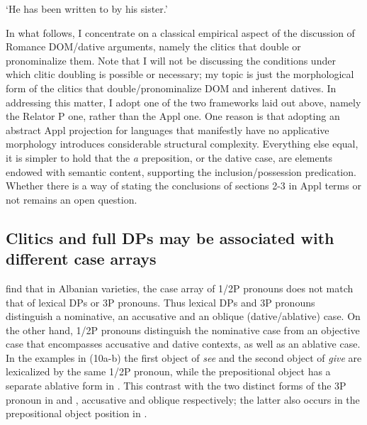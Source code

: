 \documentclass[output=paper]{langscibook}
\begin{document}
  ‘He has been written to by his sister.’


In what follows, I concentrate on a classical empirical aspect of the discussion of Romance DOM/dative arguments, namely the clitics that double or pronominalize them. Note that I will not be discussing the conditions under which clitic doubling is possible or necessary; my topic is just the morphological form of the clitics that double/pronominalize DOM and inherent datives. In addressing this matter, I adopt one of the two frameworks laid out above, namely the Relator P one, rather than the Appl one. One reason is that adopting an abstract Appl projection for languages that manifestly have no applicative morphology introduces considerable structural complexity. Everything else equal, it is simpler to hold that the \textit{a} preposition, or the dative case, are elements endowed with semantic content, supporting the inclusion/possession predication. Whether there is a way of stating the conclusions of sections 2-3 in Appl terms or not remains an open question.

\subsection{ Clitics and full DPs may be associated with different case arrays}  %

\citet{ManziniSavoia2014} find that in Albanian varieties, the case array of 1/2P pronouns does not match that of lexical DPs or 3P pronouns. Thus lexical DPs and 3P pronouns distinguish a nominative, an accusative and an oblique (dative/ablative) case. On the other hand, 1/2P pronouns distinguish the nominative case from an objective case that encompasses accusative and dative contexts, as well as an ablative case. In the examples in (10a-b) the first object of \textit{see} and the second object of \textit{give} are lexicalized by the same 1/2P pronoun, while the prepositional object has a separate ablative form in . This contrast with the two distinct forms of the 3P pronoun in  and , accusative and oblique respectively; the latter also occurs in the prepositional object position in .  

\ea\label{ex:key:}
{}\\
\z
\end{document}
